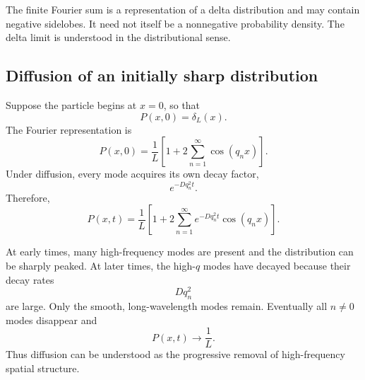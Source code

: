 
The finite Fourier sum is a representation of a delta distribution and may contain negative sidelobes.
It need not itself be a nonnegative probability density.
The delta limit is understood in the distributional sense.
\subsection{Diffusion of an initially sharp distribution}
\label{sec:sharp}



Suppose the particle begins at $x=0$, so that
% 
\[
    P(x,0) = \delta_L(x).
\]
% 
The Fourier representation is
% 
\[
    P(x,0) = \frac{1}{L} \left[ 1 + 2\sum_{n=1}^{\infty} \cos(q_nx) \right].
\]
% 
Under diffusion, every mode acquires its own decay factor,
% 
\[
    e^{-Dq_n^2t}.
\]
% 
Therefore,
% 
\[
    \boxed{ P(x,t) = \frac{1}{L} \left[ 1 + 2\sum_{n=1}^{\infty} e^{-Dq_n^2t} \cos(q_nx) \right]. }
\]

At early times, many high-frequency modes are present and the
distribution can be sharply peaked.
At later times, the high-$q$ modes have decayed because their decay rates
% 
\[
    D q_n^2
\]
% 
are large. 
Only the smooth, long-wavelength modes remain.
Eventually all $n\neq0$ modes disappear and
% 
\[
    P(x,t) \longrightarrow \frac{1}{L}.
\]
% 
Thus diffusion can be understood as the progressive removal of
high-frequency spatial structure.



